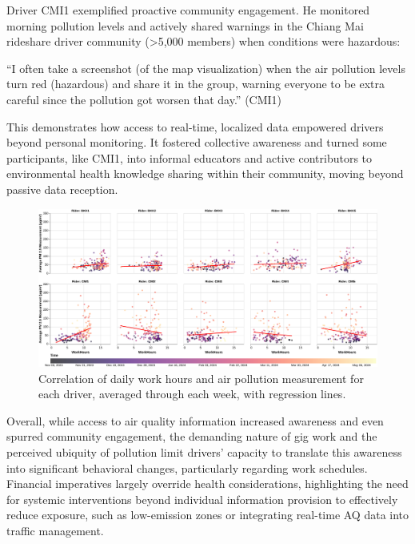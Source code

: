 Driver CMI1 exemplified proactive community engagement.
He monitored morning pollution levels and actively shared warnings in the Chiang Mai rideshare driver community (>5,000 members) when conditions were hazardous:

\begin{quoteb}
 ``I often take a screenshot (of the map visualization) when the air pollution levels turn red (hazardous) and share it in the group, warning everyone to be extra careful since the pollution got worsen that day.'' (CMI1)
\end{quoteb}

This demonstrates how access to real-time, localized data empowered drivers beyond personal monitoring.
It fostered collective awareness and turned some participants, like CMI1, into informal educators and active contributors to environmental health knowledge sharing within their community, moving beyond passive data reception.

\begin{figure}
    \centering
    \includegraphics[width=\textwidth]{figures/work-hours-vs-aqi-per-rider-regression.pdf}
    \caption{Correlation of daily work hours and air pollution measurement for each driver, averaged through each week, with regression lines.
    }
    \Description{}
    \label{fig:work-hours-vs-aqi-per-rider}
\end{figure}

Overall, while access to air quality information increased awareness and even spurred community engagement, the demanding nature of gig work and the perceived ubiquity of pollution limit drivers' capacity to translate this awareness into significant behavioral changes, particularly regarding work schedules.
Financial imperatives largely override health considerations, highlighting the need for systemic interventions beyond individual information provision to effectively reduce exposure, such as low-emission zones or integrating real-time AQ data into traffic management.